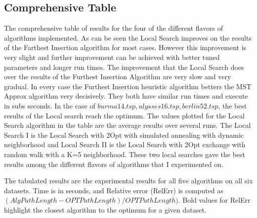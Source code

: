 \documentclass[twoside,11pt]{article}
\begin{document}
\subsection{Comprehensive Table}
\item
The comprehensive table of results for the four of the different flavors of algorithms implemented. As can be seen the Local Search improves on the results of the Farthest Insertion algorithm for most cases. However this improvement is very slight and further improvement can be achieved with better tuned parameters and longer run times. The improvement that the Local Search does over the results of the Furthest Insertion Algorithm are very slow and very gradual. In every case the Furthest Insertion heuristic algorithm betters the MST Approx algorithm very decisively. They both have similar run times and execute in subs seconds. In the case of $burma14.tsp,ulysses16.tsp,berlin52.tsp$, the best results of the Local search reach the optimum. The values plotted for the Local Search algorithm in the table are the average results over several runs. The Local Search I is the Local Search with 2Opt with simulated annealing with dynamic neighborhood and Local Search II is the Local Search with 2Opt exchange with random walk with a K=5 neighborhood. These two local searches gave the best results among the different flavors of algorithms that I experimented on.
\item
The tabulated results are the experimental results for all five algorithms on all six datasets. Time is in seconds, and Relative error (RelErr) is computed as $(AlgPathLength - OPTPathLength)/ OPTPathLength)$. Bold values for RelErr highlight the closest algorithm to the optimum for a given dataset. 
\end{document}
